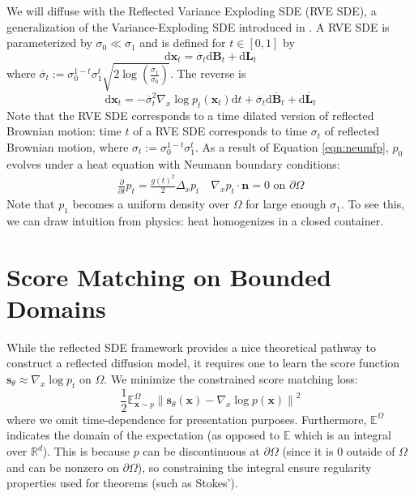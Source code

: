 \documentclass{article}
\theoremstyle{plain}
\theoremstyle{definition}
\theoremstyle{remark}
\newcommand{\R}{\mathbb{R}}
\newcommand{\E}{\mathbb{E}}
\newcommand{\paren}[1]{\left(#1\right)}
\newcommand{\norm}[1]{\left\|#1\right\|}
\newcommand{\grad}{\nabla}
\newcommand{\parderiv}[2]{\frac{\partial #1}{\partial #2}}
\renewcommand{\vec}{\mathbf}
\newcommand{\dd}{\mathrm{d}}
\begin{document}
We will diffuse with the  Reflected Variance Exploding SDE (RVE SDE), a generalization of the Variance-Exploding SDE introduced in \citet{Song2020ScoreBasedGM}. A RVE SDE is parameterized by $\sigma_0 \ll \sigma_1$ and is defined for $t \in [0, 1]$ by
\begin{equation}\label{eqn:reflectve}
    \dd \vec{x}_t = \overline{\sigma}_t \dd \vec{B}_t + \dd \vec{L}_t
\end{equation}
where $\overline{\sigma}_t := \sigma_0^{1 - t} \sigma_1^t \sqrt{2 \log\paren{\frac{\sigma_1}{\sigma_0}}}$. The reverse is
\begin{equation}
    \dd \vec{x}_t = -\overline{\sigma}_t^2 \grad_x \log p_t(\vec{x}_t) \dd t + \overline{\sigma}_t \dd \overline{\vec{B}}_t + \dd \overline{\vec{L}}_t
\end{equation}
Note that the RVE SDE corresponds to a time dilated version of reflected Brownian motion: time $t$ of a RVE SDE corresponds to time $\sigma_t$ of reflected Brownian motion, where $\sigma_t := \sigma_0^{1 - t}\sigma_1^t$. As a result of Equation \ref{eqn:neumfp}, $p_0$ evolves under a heat equation with Neumann boundary conditions:
\begin{equation}\label{eqn:neumhe}
    \begin{gathered}
        \parderiv{}{t}p_t = \frac{g(t)^2}{2} \Delta_x p_t \quad \grad_x p_t \cdot \vec{n} = 0 \text{ on } \partial \Omega
    \end{gathered}
\end{equation}
Note that $p_1$ becomes a uniform density over $\Omega$ for large enough $\sigma_1$. To see this, we can draw intuition from physics: heat homogenizes in a closed container.

 \section{Score Matching on Bounded Domains}\label{sec:scorematching}

While the reflected SDE framework provides a nice theoretical pathway to construct a reflected diffusion model, it requires one to learn the score function $\vec{s}_\theta \approx \grad_x \log p_t$ on $\Omega$. We minimize the constrained score matching loss:
\begin{equation}\label{eqn:bsm}
    \frac{1}{2} \E_{\vec{x} \sim p}^\Omega \norm{\vec{s}_\theta(\vec{x}) - \grad_x \log p(\vec{x})}^2
\end{equation}
where we omit time-dependence for presentation purposes. Furthermore, $\E^\Omega$ indicates the domain of the expectation (as opposed to $\E$ which is an integral over $\R^d$). This is because $p$ can be discontinuous at $\partial \Omega$ (since it is $0$ outside of $\Omega$ and can be nonzero on $\partial \Omega$), so constraining the integral ensure regularity properties used for theorems (such as Stokes').
\end{document}

